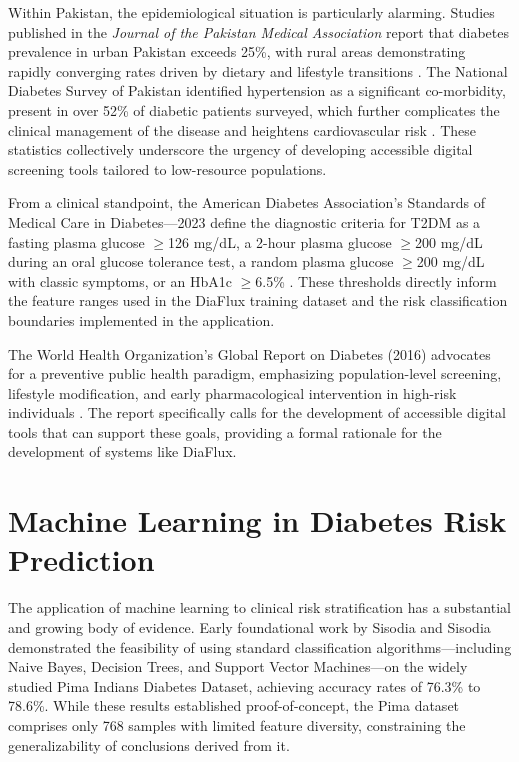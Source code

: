 \documentclass[12pt,a4paper]{report}
\begin{document}
Within Pakistan, the epidemiological situation is particularly alarming. Studies published in the \textit{Journal of the Pakistan Medical Association} report that diabetes prevalence in urban Pakistan exceeds 25\%, with rural areas demonstrating rapidly converging rates driven by dietary and lifestyle transitions \cite{jpma_pak_diabetes}. The National Diabetes Survey of Pakistan identified hypertension as a significant co-morbidity, present in over 52\% of diabetic patients surveyed, which further complicates the clinical management of the disease and heightens cardiovascular risk \cite{ndi_pak_report}. These statistics collectively underscore the urgency of developing accessible digital screening tools tailored to low-resource populations.

From a clinical standpoint, the American Diabetes Association's Standards of Medical Care in Diabetes---2023 define the diagnostic criteria for T2DM as a fasting plasma glucose $\geq$126 mg/dL, a 2-hour plasma glucose $\geq$200 mg/dL during an oral glucose tolerance test, a random plasma glucose $\geq$200 mg/dL with classic symptoms, or an HbA1c $\geq$6.5\% \cite{ada_standards_2023}. These thresholds directly inform the feature ranges used in the DiaFlux training dataset and the risk classification boundaries implemented in the application.

The World Health Organization's Global Report on Diabetes (2016) advocates for a preventive public health paradigm, emphasizing population-level screening, lifestyle modification, and early pharmacological intervention in high-risk individuals \cite{who_global_report}. The report specifically calls for the development of accessible digital tools that can support these goals, providing a formal rationale for the development of systems like DiaFlux.

\section{Machine Learning in Diabetes Risk Prediction}
The application of machine learning to clinical risk stratification has a substantial and growing body of evidence. Early foundational work by Sisodia and Sisodia \cite{sisodia_diabetes} demonstrated the feasibility of using standard classification algorithms---including Naive Bayes, Decision Trees, and Support Vector Machines---on the widely studied Pima Indians Diabetes Dataset, achieving accuracy rates of 76.3\% to 78.6\%. While these results established proof-of-concept, the Pima dataset comprises only 768 samples with limited feature diversity, constraining the generalizability of conclusions derived from it.
\end{document}
